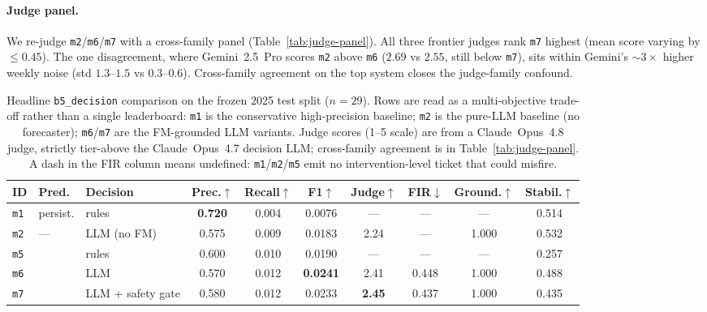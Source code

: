 \paragraph{Judge panel.}
We re-judge \texttt{m2}/\texttt{m6}/\texttt{m7} with a
cross-family panel (Table~\ref{tab:judge-panel}). All three
frontier judges rank \texttt{m7} highest (mean score varying by
$\leq\!0.45$). The one disagreement, where Gemini~2.5~Pro scores
\texttt{m2} above \texttt{m6} ($2.69$ vs $2.55$, still below
\texttt{m7}), sits within Gemini's ${\sim}3\times$ higher weekly
noise (std $1.3$--$1.5$ vs $0.3$--$0.6$). Cross-family agreement
on the top system closes the judge-family confound.

\begin{table}[t]
\centering
\small
\setlength{\tabcolsep}{4.5pt}
\begin{tabular*}{\linewidth}{@{\extracolsep{\fill}}lllccccccc@{}}
\toprule
ID & Pred. & Decision & Prec.$\uparrow$ & Recall$\uparrow$ & F1$\uparrow$ & Judge$\uparrow$ & FIR$\downarrow$ & Ground.$\uparrow$ & Stabil.$\uparrow$ \\
\midrule
\texttt{m1} & persist.   & rules               & \textbf{0.720} & 0.004 & 0.0076          & ---            & ---            & ---   & 0.514 \\
\texttt{m2} & ---        & LLM (no FM)         & 0.575          & 0.009 & 0.0183          & 2.24           & ---            & 1.000 & 0.532 \\
\texttt{m5} & \fmname{}  & rules               & 0.600          & 0.010 & 0.0190          & ---            & ---            & ---   & 0.257 \\
\texttt{m6} & \fmname{}  & LLM                 & 0.570          & 0.012 & \textbf{0.0241} & 2.41           & 0.448          & 1.000 & 0.488 \\
\texttt{m7} & \fmname{}  & LLM + safety gate   & 0.580          & 0.012 & 0.0233          & \textbf{2.45}  & 0.437          & 1.000 & 0.435 \\
\bottomrule
\end{tabular*}
\caption{Headline \texttt{b5\_decision} comparison on the frozen
2025 test split ($n\!=\!29$). Rows are read as a multi-objective
trade-off rather than a single leaderboard: \texttt{m1} is the
conservative high-precision baseline; \texttt{m2} is the pure-LLM
baseline (no forecaster); \texttt{m6}/\texttt{m7} are the
FM-grounded LLM variants. Judge scores (1--5 scale) are from a
Claude~Opus~4.8 judge, strictly tier-above the Claude~Opus~4.7
decision LLM; cross-family agreement is in
Table~\ref{tab:judge-panel}. A dash in the FIR column means
undefined: \texttt{m1}/\texttt{m2}/\texttt{m5} emit no
intervention-level ticket that could misfire.}
\label{tab:headline}
\end{table}

